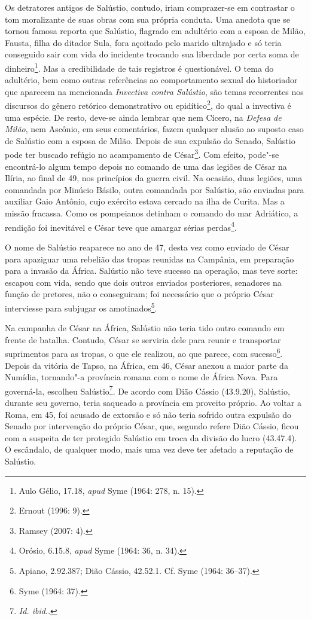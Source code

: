 Os detratores antigos de Salústio, contudo, iriam comprazer-se em contrastar o
tom moralizante de suas obras com sua própria conduta. Uma anedota que se
tornou famosa reporta que Salústio, flagrado em adultério com a esposa de
Milão, Fausta, filha do ditador Sula, fora açoitado pelo marido ultrajado e só
teria conseguido sair com vida do incidente trocando sua liberdade por certa
soma de dinheiro\footnote{ Aulo Gélio,  17.18, \emph{apud} Syme (1964: 
278, n. 15).}.  Mas a credibilidade de tais registros é questionável. O tema do
adultério, bem como outras referências ao comportamento sexual do historiador
que aparecem na mencionada \emph{Invectiva contra Salústio}, são temas
recorrentes nos discursos do gênero retórico demonstrativo ou
epidítico\footnote{Ernout (1996: 9).}, do qual a invectiva é uma espécie. De resto, deve-se ainda lembrar que nem
Cícero, na \emph{Defesa de Milão}, nem Ascônio, em seus comentários, fazem
qualquer alusão ao suposto caso de Salústio com a esposa de Milão.  Depois de
sua expulsão do Senado, Salústio pode ter buscado refúgio no acampamento de
César\footnote{Ramsey (2007: 4).}. Com efeito, pode"-se encontrá-lo algum
tempo depois no comando de uma das legiões de César na Ilíria, ao final de 49,
nos princípios da guerra civil. Na ocasião, duas legiões, uma comandada por
Minúcio Básilo, outra comandada por Salústio, são enviadas para auxiliar Gaio
Antônio, cujo exército estava cercado na ilha de Curita. Mas a missão fracassa.
Como os pompeianos detinham o comando do mar Adriático, a rendição foi
inevitável e César teve que amargar sérias perdas\footnote{Orósio, 6.15.8,
\emph{apud} Syme (1964: 36, n. 34).}.

O nome de Salústio reaparece no ano de 47, desta vez como enviado de César para
apaziguar uma rebelião das tropas reunidas na Campânia, em preparação para a
invasão da África. Salústio não teve sucesso na operação, mas teve sorte:
escapou com vida, sendo que dois outros enviados posteriores, senadores na função de pretores, não o conseguiram; foi necessário que o próprio César
interviesse para subjugar os amotinados\footnote{Apiano, \emph{} 2.92.387; Dião Cássio, 42.52.1. Cf. Syme (1964: 36--37).}. 

Na campanha de César na África, Salústio não teria tido outro comando em frente
de batalha. Contudo, César se serviria dele para reunir e transportar
suprimentos para as tropas, o que ele realizou, ao que parece, com
sucesso\footnote{Syme (1964: 37).}. Depois da vitória de Tapso, na África,
em 46, César anexou a maior parte da Numídia, tornando"-a província romana com o
nome de África Nova. Para governá-la, escolheu Salústio\footnote{\emph{ Id.
ibid.}.}. De acordo com Dião Cássio (43.9.20),  Salústio, durante seu
governo, teria saqueado a província em proveito próprio. Ao voltar a Roma, em
45, foi acusado de extorsão e só não teria sofrido outra expulsão do Senado por
intervenção do próprio César, que, segundo refere Dião Cássio, ficou com a
suspeita de ter protegido Salústio em troca da divisão do lucro (43.47.4). O
escândalo, de qualquer modo, mais uma vez deve ter afetado a reputação de
Salústio.

